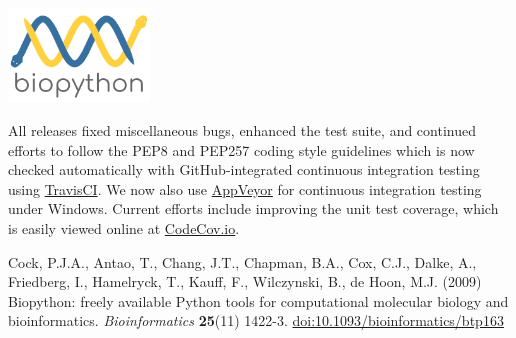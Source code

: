 \documentclass[10pt,oneside]{article}
\begin{document}
\begin{center}
\includegraphics[height=2.5cm]{../presentation/figures/biopython_logo_s.png}
\end{center}

All releases fixed miscellaneous bugs, enhanced the test suite,
and continued efforts to follow the PEP8 and PEP257 coding style guidelines
which is now checked automatically with GitHub-integrated continuous integration
testing using \href{https://travis-ci.org/biopython/biopython/builds}{TravisCI}.
We now also use \href{https://ci.appveyor.com/project/biopython/biopython/history}{AppVeyor}
for continuous integration testing under Windows.
Current efforts include improving the unit test coverage, which is easily viewed
online at \href{https://codecov.io/github/biopython/biopython/}{CodeCov.io}.

\begin{thebibliography}{}

Cock, P.J.A., Antao, T., Chang, J.T., Chapman, B.A., Cox, C.J., Dalke, A., Friedberg, I., Hamelryck, T., Kauff, F., Wilczynski, B., de Hoon, M.J. (2009) Biopython: freely available Python tools for computational molecular biology and bioinformatics. {\it Bioinformatics} {\bf 25}(11) 1422-3. \href{http://dx.doi.org/10.1093/bioinformatics/btp163}{doi:10.1093/bioinformatics/btp163}

\end{thebibliography}
\end{document}

